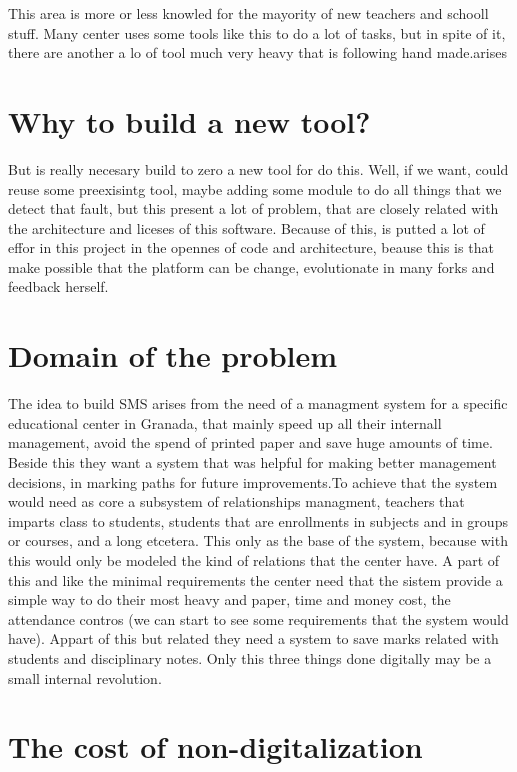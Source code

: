 This area is more or less knowled for the mayority of new teachers
and schooll stuff. Many center uses some tools like this to do a lot
of tasks, but in spite of it, there are another a lo of tool much
very heavy that is following hand made.arises

\section{Why to build a new tool?}

But is really necesary build to zero a new tool for do this. Well,
if we want, could reuse some preexisintg tool, maybe adding some module
to do all things that we detect that fault, but this present a lot
of problem, that are closely related with the architecture and liceses
of this software. Because of this, is putted a lot of effor in this
project in the opennes of code and architecture, beause this is that
make possible that the platform can be change, evolutionate in many
forks and feedback herself.

\section{Domain of the problem}

The idea to build SMS arises from the need of a managment system for
a specific educational center in Granada, that mainly speed up all
their internall management, avoid the spend of printed paper and save
huge amounts of time. Beside this they want a system that was helpful
for making better management decisions, in marking paths for future
improvements.\bigskip To achieve that the system would need as core
a subsystem of relationships managment, teachers that imparts class
to students, students that are enrollments in subjects and in groups
or courses, and a long etcetera. This only as the base of the system,
because with this would only be modeled the kind of relations that
the center have. A part of this and like the minimal requirements
the center need that the sistem provide a simple way to do their most
heavy and paper, time and money cost, the attendance contros (we can
start to see some requirements that the system would have). Appart
of this but related they need a system to save marks related with
students and disciplinary notes. Only this three things done digitally
may be a small internal revolution.

\section{The cost of non-digitalization}

